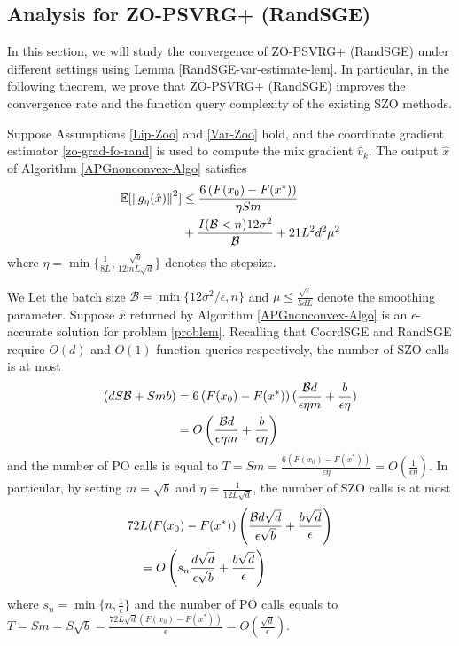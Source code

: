 \subsection{Analysis for ZO-PSVRG+ (RandSGE)}
In this section, we will study the convergence of ZO-PSVRG+ (RandSGE) under different settings using Lemma \ref{RandSGE-var-estimate-lem}. In particular, in the following theorem, we prove that ZO-PSVRG+ (RandSGE) improves the convergence rate and the function query complexity of the existing SZO methods.
\begin{theorem}\label{noncon-zoo-rand}
Suppose Assumptions \ref{Lip-Zoo} and \ref{Var-Zoo} hold, and the coordinate gradient estimator \eqref{zo-grad-fo-rand} is used to compute the mix gradient $\hat{v}_k$. The output $\hat{x}$ of Algorithm \ref{APGnonconvex-Algo} satisfies
  \begin{align}
\E[\norm{g_{\eta}(\hat{x})}^2] & \leq \frac{6\left(F(x_0) - F({x}^*)\right)}{\eta Sm}\notag\\
&  + \frac{I(\mathcal{B} < n)12\sigma ^2}{\mathcal{B}}+21{L^2 d^2 \mu^2}\label{eq-noncon-zoo-rand}
 \end{align}
where $\eta = \min\{\frac{1}{8L}, \frac{\sqrt{b}}{12mL\sqrt{d}}\}$ denotes the stepsize.
\end{theorem}
\begin{corollary}\label{corr11-rand}
We Let the batch size $\mathcal{B} = \min\{12\sigma^2/\epsilon, n\}$ and $\mu \leq \frac{\sqrt{\epsilon}}{5{dL}}$ denote the smoothing parameter. Suppose $\hat{x}$ returned by Algorithm \ref{APGnonconvex-Algo} is an $\epsilon$-accurate solution for problem \eqref{problem}. Recalling that CoordSGE and RandSGE require $O(d)$ and $O(1)$ function queries respectively, the number of SZO calls is at most 
\begin{align}
(dS\mathcal{B}+Smb) & = 6 \left(F(x_0) - F({x}^*)\right) (\frac{\mathcal{B}d}{\epsilon\eta m}+\frac{b}{\epsilon\eta})\notag\\
& = O\left(\frac{\mathcal{B}d}{\epsilon\eta m}+\frac{b}{\epsilon\eta}\right)\label{SZO-call-nocon-rand}
\end{align} 
and the number of PO calls is equal to $T = Sm = \frac{6\left(F(x_0) - F({x}^*)\right)}{\epsilon\eta} = O\left(\frac{1}{\epsilon\eta}\right)$. In particular, by setting $m=\sqrt{b}$ and $\eta = \frac{1}{12L\sqrt{d}}$, the number of SZO calls is at most 
\begin{align}
72 &L (F(x_0)-F(x^*))\left(\frac{\mathcal{B}d\sqrt{d}}{\epsilon\sqrt{b}}+\frac{b\sqrt{d}}{\epsilon}\right)\notag\\
& = O\left(s_n\frac{d\sqrt{d}}{\epsilon \sqrt{b}}+\frac{b\sqrt{d}}{\epsilon}\right)\label{SZO-call-par-nocon-rand}
\end{align}
where $s_n = \min\{n,\frac{1}{\epsilon}\}$ and the number of PO calls equals to $T = Sm = S\sqrt{b} = \frac{72 L \sqrt{d}\left(F(x_0) - F({x}^*)\right)}{\epsilon} = O\left(\frac{\sqrt{d}}{\epsilon}\right)$. 
\end{corollary}

